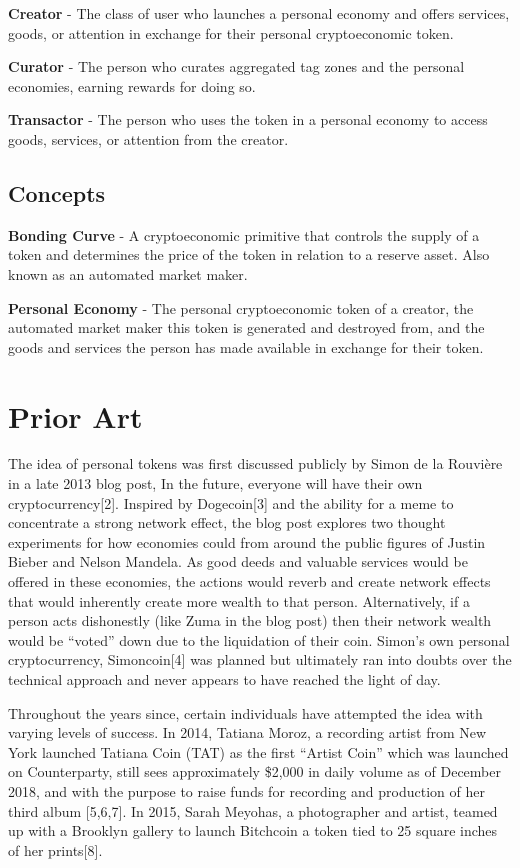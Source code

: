 \documentclass[a4paper, 10pt]{article}
\begin{document}
\begin{appendices}
\noindent
\textbf{Creator} - The class of user who launches a personal economy and offers services, goods, or attention in exchange for their personal cryptoeconomic token.
\medskip

\noindent
\textbf{Curator} - The person who curates aggregated tag zones and the personal economies, earning rewards for doing so.
\medskip

\noindent
\textbf{Transactor} - The person who uses the token in a personal economy to access goods, services, or attention from the creator. 

\subsection{Concepts}

\textbf{Bonding Curve} - A cryptoeconomic primitive that controls the supply of a token and determines the price of the token in relation to a reserve asset. Also known as an automated market maker. 
\medskip


\noindent
\textbf{Personal Economy} - The personal cryptoeconomic token of a creator, the automated market maker this token is generated and destroyed from, and the goods and services the person has made available in exchange for their token.

\section{Prior Art}

The idea of personal tokens was first discussed publicly by Simon de la Rouvière in a late 2013 blog post,  In the future, everyone will have their own cryptocurrency[2]. Inspired by Dogecoin[3] and the ability for a meme to concentrate a strong network effect, the blog post explores two thought experiments for how economies could from around the public figures of Justin Bieber and Nelson Mandela. As good deeds and valuable services would be offered in these economies, the actions would reverb and create network effects that would inherently create more wealth to that person. Alternatively, if a person acts dishonestly (like Zuma in the blog post) then their network wealth would be “voted” down due to the liquidation of their coin.  Simon’s own personal cryptocurrency, Simoncoin[4] was planned but ultimately ran into doubts over the technical approach and never appears to have reached the light of day.

Throughout the years since, certain individuals have attempted the idea with varying levels of success. In 2014, Tatiana Moroz, a recording artist from New York launched Tatiana Coin (TAT) as the first “Artist Coin” which was launched on Counterparty, still sees approximately \$2,000 in daily volume as of December 2018, and with the purpose to raise funds for recording and production of her third album [5,6,7]. In 2015, Sarah Meyohas, a photographer and artist, teamed up with a Brooklyn gallery to launch Bitchcoin a token tied to 25 square inches of her prints[8]. 

\end{appendices}
\end{document}

